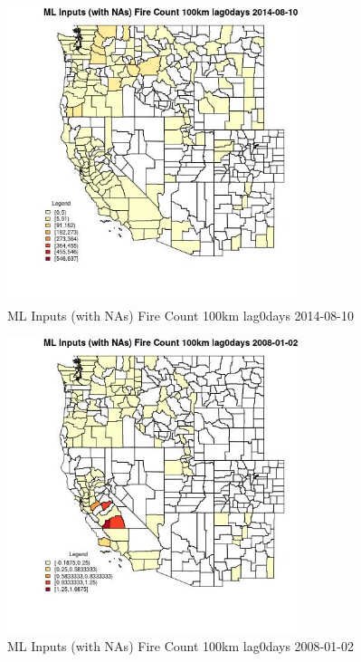 \begin{figure} 
\centering  
\includegraphics[width=0.77\textwidth]{Code_Outputs/Report_ML_input_PM25_Step4_part_e_de_duplicated_aves_compiled_2019-05-18wNAs_CountyFire_Count_100km_lag0daysMean2014-08-10.jpg} 
\caption{\label{fig:Report_ML_input_PM25_Step4_part_e_de_duplicated_aves_compiled_2019-05-18wNAsCountyFire_Count_100km_lag0daysMean2014-08-10}ML Inputs (with NAs) Fire Count 100km lag0days 2014-08-10} 
\end{figure} 
 

\begin{figure} 
\centering  
\includegraphics[width=0.77\textwidth]{Code_Outputs/Report_ML_input_PM25_Step4_part_e_de_duplicated_aves_compiled_2019-05-18wNAs_CountyFire_Count_100km_lag0daysMean2008-01-02.jpg} 
\caption{\label{fig:Report_ML_input_PM25_Step4_part_e_de_duplicated_aves_compiled_2019-05-18wNAsCountyFire_Count_100km_lag0daysMean2008-01-02}ML Inputs (with NAs) Fire Count 100km lag0days 2008-01-02} 
\end{figure} 
 

